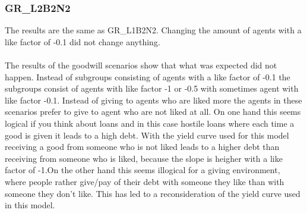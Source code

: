 \documentclass[twoside,openright]{uva-bachelor-thesis}
\begin{document}
\subsubsection{GR\_L2B2N2}
The results are the same as GR\_L1B2N2. Changing the amount of agents with a like factor of -0.1 did not change anything.
\\
\\
The results of the goodwill scenarios show that what was expected did not happen. Instead of subgroups consisting of agents with a like factor of -0.1 the subgroups consist of agents with like factor -1 or -0.5 with sometimes agent with like factor -0.1. Instead of giving to agents who are liked more the agents in these scenarios prefer to give to agent who are not liked at all. On one hand this seems logical if you think about loans and in this case hostile loans where each time a good is given it leads to a high debt. With the yield curve used for this model receiving a good from someone who is not liked leads to a higher debt than receiving from someone who is liked, because the slope is heigher with a like factor of -1.On the other hand this seems illogical for a giving environment, where people rather give/pay of their debt with someone they like than with someone they don't like. This has led to a reconsideration of the yield curve used in this model.
\end{document}
